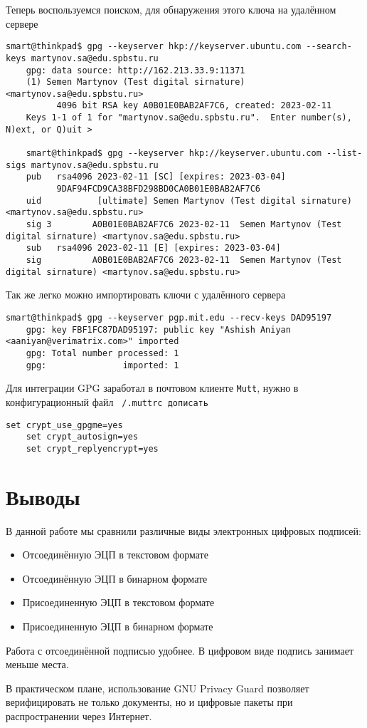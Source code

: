 Теперь воспользуемся поиском, для обнаружения этого ключа на удалённом сервере
\begin{Verbatim}[frame=single]
    smart@thinkpad$ gpg --keyserver hkp://keyserver.ubuntu.com --search-keys martynov.sa@edu.spbstu.ru
    gpg: data source: http://162.213.33.9:11371
    (1)	Semen Martynov (Test digital sirnature) <martynov.sa@edu.spbstu.ru>
    	  4096 bit RSA key A0B01E0BAB2AF7C6, created: 2023-02-11
    Keys 1-1 of 1 for "martynov.sa@edu.spbstu.ru".  Enter number(s), N)ext, or Q)uit >

    smart@thinkpad$ gpg --keyserver hkp://keyserver.ubuntu.com --list-sigs martynov.sa@edu.spbstu.ru
    pub   rsa4096 2023-02-11 [SC] [expires: 2023-03-04]
          9DAF94FCD9CA38BFD298BD0CA0B01E0BAB2AF7C6
    uid           [ultimate] Semen Martynov (Test digital sirnature) <martynov.sa@edu.spbstu.ru>
    sig 3        A0B01E0BAB2AF7C6 2023-02-11  Semen Martynov (Test digital sirnature) <martynov.sa@edu.spbstu.ru>
    sub   rsa4096 2023-02-11 [E] [expires: 2023-03-04]
    sig          A0B01E0BAB2AF7C6 2023-02-11  Semen Martynov (Test digital sirnature) <martynov.sa@edu.spbstu.ru>
\end{Verbatim}

Так же легко можно импортировать ключи с удалённого сервера
\begin{Verbatim}[frame=single]
    smart@thinkpad$ gpg --keyserver pgp.mit.edu --recv-keys DAD95197
    gpg: key FBF1FC87DAD95197: public key "Ashish Aniyan <aaniyan@verimatrix.com>" imported
    gpg: Total number processed: 1
    gpg:               imported: 1
\end{Verbatim}

Для интеграции GPG заработал в почтовом клиенте \texttt{Mutt}, нужно в конфигурационный файл \texttt{~/.muttrc дописать}
\begin{Verbatim}[frame=single]
    set crypt_use_gpgme=yes
    set crypt_autosign=yes
    set crypt_replyencrypt=yes
\end{Verbatim}

\section*{Выводы}

В данной работе мы сравнили различные виды электронных цифровых подписей:
\begin{itemize}
    \item Отсоединённую ЭЦП в текстовом формате
    \item Отсоединённую ЭЦП в бинарном формате
    \item Присоединенную ЭЦП в текстовом формате
    \item Присоединенную ЭЦП в бинарном формате
\end{itemize}

Работа с отсоединённой подписью удобнее. В цифровом виде подпись занимает меньше места.

В практическом плане, использование GNU Privacy Guard позволяет верифицировать не только документы, но и цифровые пакеты при распространении через Интернет.
